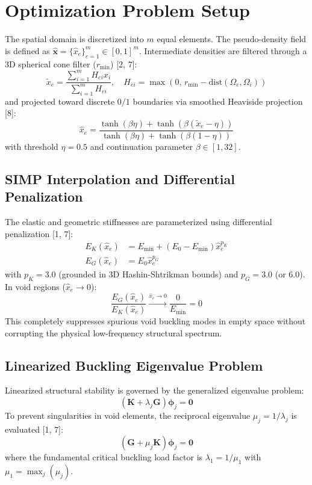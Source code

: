 \documentclass[11pt, a4paper]{article}
\begin{document}
\section{Optimization Problem Setup}
The spatial domain is discretized into $m$ equal elements. The pseudo-density field is defined as $\hat{\mathbf{x}} = \{\hat{x}_e\}_{e=1}^m \in [0, 1]^m$. Intermediate densities are filtered through a 3D spherical cone filter ($r_{\min}$) [2, 7]:
\begin{equation}
\tilde{x}_e = \frac{\sum_{i=1}^m H_{ei} x_i}{\sum_{i=1}^m H_{ei}}, \quad H_{ei} = \max(0, \, r_{\min} - \text{dist}(\Omega_e, \Omega_i))
\end{equation}
and projected toward discrete $0/1$ boundaries via smoothed Heaviside projection [8]:
\begin{equation}
\hat{x}_e = \frac{\tanh(\beta \eta) + \tanh(\beta (\tilde{x}_e - \eta))}{\tanh(\beta \eta) + \tanh(\beta (1 - \eta))}
\end{equation}
with threshold $\eta = 0.5$ and continuation parameter $\beta \in [1, 32]$.

\subsection{SIMP Interpolation and Differential Penalization}
The elastic and geometric stiffnesses are parameterized using differential penalization [1, 7]:
\begin{align}
E_K(\hat{x}_e) &= E_{\min} + (E_0 - E_{\min}) \hat{x}_e^{p_K} \\
E_G(\hat{x}_e) &= E_0 \hat{x}_e^{p_G}
\end{align}
with $p_K = 3.0$ (grounded in 3D Hashin-Shtrikman bounds) and $p_G = 3.0$ (or $6.0$). In void regions ($\hat{x}_e \to 0$):
\begin{equation}
\frac{E_G(\hat{x}_e)}{E_K(\hat{x}_e)} \xrightarrow{\hat{x}_e \to 0} \frac{0}{E_{\min}} = 0
\end{equation}
This completely suppresses spurious void buckling modes in empty space without corrupting the physical low-frequency structural spectrum.

\subsection{Linearized Buckling Eigenvalue Problem}
Linearized structural stability is governed by the generalized eigenvalue problem:
\begin{equation}
(\mathbf{K} + \lambda_j \mathbf{G}) \boldsymbol{\phi}_j = \mathbf{0}
\end{equation}
To prevent singularities in void elements, the reciprocal eigenvalue $\mu_j = 1/\lambda_j$ is evaluated [1, 7]:
\begin{equation}
(\mathbf{G} + \mu_j \mathbf{K}) \boldsymbol{\phi}_j = \mathbf{0}
\end{equation}
where the fundamental critical buckling load factor is $\lambda_1 = 1/\mu_1$ with $\mu_1 = \max_j(\mu_j)$.
\end{document}
